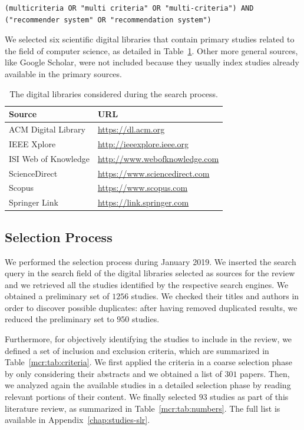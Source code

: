 \begin{lstlisting}
(multicriteria OR "multi criteria" OR "multi-criteria") AND ("recommender system" OR "recommendation system")
\end{lstlisting}

We selected six scientific digital libraries that contain primary studies related to the field of computer science, as detailed in Table~\ref{mcr:tab:sources}. Other more general sources, like Google Scholar, were not included because they usually index studies already available in the primary sources.

\begin{table}
\centering
\begin{tabular}{@{}ll@{}}
\toprule
Source               & URL                                 \\ \midrule
ACM Digital Library  & \url{https://dl.acm.org}            \\
IEEE Xplore          & \url{http://ieeexplore.ieee.org}    \\
ISI Web of Knowledge & \url{http://www.webofknowledge.com} \\
ScienceDirect        & \url{https://www.sciencedirect.com} \\
Scopus               & \url{https://www.scopus.com}        \\
Springer Link        & \url{https://link.springer.com}     \\ \bottomrule
\end{tabular}
\caption[Digital libraries considered]{The digital libraries considered during the search process.}
\label{mcr:tab:sources}
\end{table}

\subsection{Selection Process}
We performed the selection process during January 2019. We inserted the search query in the search field of the digital libraries selected as sources for the review and we retrieved all the studies identified by the respective search engines. We obtained a preliminary set of $1256$ studies. We checked their titles and authors in order to discover possible duplicates: after having removed duplicated results, we reduced the preliminary set to $950$ studies.

Furthermore, for objectively identifying the studies to include in the review, we defined a set of inclusion and exclusion criteria, which are summarized in Table~\ref{mcr:tab:criteria}. We first applied the criteria in a coarse selection phase by only considering their abstracts and we obtained a list of $301$ papers. Then, we analyzed again the available studies in a detailed selection phase by reading relevant portions of their content. We finally selected $93$ studies as part of this literature review, as summarized in Table~\ref{mcr:tab:numbers}. The full list is available in Appendix~\ref{chap:studies-slr}.

